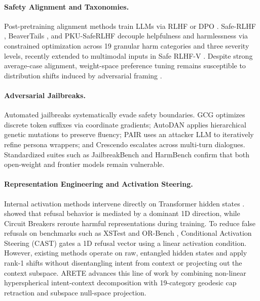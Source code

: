 \documentclass[11pt,twocolumn,a4paper]{article}
\begin{document}
\paragraph{Safety Alignment and Taxonomies.}
Post-pretraining alignment methods train LLMs via RLHF \citep{christiano2017deep,ouyang2022training,bai2022constitutional} or DPO \citep{rafailov2023direct}. Safe-RLHF \citep{dai2024safe}, BeaverTails \citep{ji2023beavertails}, and PKU-SafeRLHF \citep{ji2024pkusaferlhf} decouple helpfulness and harmlessness via constrained optimization across 19 granular harm categories and three severity levels, recently extended to multimodal inputs in Safe RLHF-V \citep{ji2025saferlhfv}. Despite strong average-case alignment, weight-space preference tuning remains susceptible to distribution shifts induced by adversarial framing \citep{wei2024jailbroken,carlini2019evaluating,tramer2020adaptive}.

\paragraph{Adversarial Jailbreaks.}
Automated jailbreaks systematically evade safety boundaries. GCG \citep{zou2023universal} optimizes discrete token suffixes via coordinate gradients; AutoDAN \citep{liu2023autodan} applies hierarchical genetic mutations to preserve fluency; PAIR \citep{chao2023jailbreaking} uses an attacker LLM to iteratively refine persona wrappers; and Crescendo \citep{russinovich2024crescendo} escalates across multi-turn dialogues. Standardized suites such as JailbreakBench \citep{chao2024jailbreakbench} and HarmBench \citep{mazeika2024harmbench} confirm that both open-weight and frontier models remain vulnerable.

\paragraph{Representation Engineering and Activation Steering.}
Internal activation methods intervene directly on Transformer hidden states \citep{zou2023representation}. \citet{arditi2024refusal} showed that refusal behavior is mediated by a dominant 1D direction, while Circuit Breakers \citep{zou2024circuit} reroute harmful representations during training. To reduce false refusals on benchmarks such as XSTest \citep{rottger2023xstest} and OR-Bench \citep{cui2024orbench}, Conditional Activation Steering (CAST) \citep{lee2024programming} gates a 1D refusal vector using a linear activation condition. However, existing methods operate on raw, entangled hidden states and apply rank-1 shifts without disentangling intent from context or projecting out the context subspace. ARETE advances this line of work by combining non-linear hyperspherical intent-context decomposition with 19-category geodesic cap retraction and subspace null-space projection.
\end{document}
